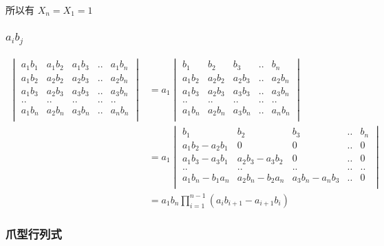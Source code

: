 \documentclass[12pt,a4paper]{ctexart}
\begin{document}
所以有 $X_n= X_1 = 1$

\subsubsection{$a_i b_j$}

\begin{align*}
    \begin{vmatrix}
        a_1b_1 & a_1b_2 & a_1b_3 & .. & a_1b_n \\
        a_1b_2 & a_2b_2 & a_2b_3 & .. & a_2b_n \\
        a_1b_3 & a_2b_3 & a_3b_3 & .. & a_3b_n \\
        .. & .. & .. & .. & .. \\
        a_1b_n & a_2b_n & a_3b_n & .. & a_nb_n \\
    \end{vmatrix} &= 
    a_1 \begin{vmatrix}
        b_1 & b_2 & b_3 & .. & b_n \\
        a_1b_2 & a_2b_2 & a_2b_3 & .. & a_2b_n \\
        a_1b_3 & a_2b_3 & a_3b_3 & .. & a_3b_n \\
        .. & .. & .. & .. & .. \\
        a_1b_n & a_2b_n & a_3b_n & .. & a_nb_n \\
    \end{vmatrix} 
    \\
   &= a_1\begin{vmatrix}
        b_1 & b_2 & b_3 & .. & b_n \\
        a_1b_2 - a_2b_1 & 0 & 0 & .. & 0 \\
        a_1b_3 - a_3b_1 & a_2b_3 - a_3b_2 & 0 & .. & 0 \\
        .. & .. & .. & .. & .. \\
        a_1b_n - b_1a_n & a_2b_n - b_2a_n & a_3b_n -a_nb_3 & .. & 0 \\
   \end{vmatrix} \\
   &= a_1b_n \prod_{i=1}^{n-1}(a_ib_{i+1} - a_{i+1}b_i)
\end{align*}

\subsubsection{爪型行列式}
\end{document}
